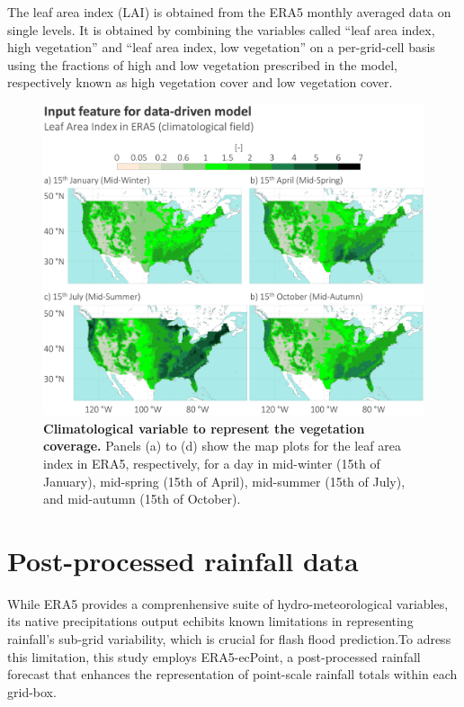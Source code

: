 The leaf area index (LAI) is obtained from the ERA5 monthly averaged data on single levels. It is obtained by combining the variables called “leaf area index, high vegetation” and “leaf area index, low vegetation” on a per-grid-cell basis using the fractions of high and low vegetation prescribed in the model, respectively known as high vegetation cover and low vegetation cover.

\begin{figure}[htbp]
\centering
\includegraphics[width=\textwidth]{lai.png}
\caption{\textbf{Climatological variable to represent the vegetation coverage.} Panels (a) to (d) show the map plots for the leaf area index in ERA5, respectively, for a day in mid-winter (15th of January), mid-spring (15th of April), mid-summer (15th of July), and mid-autumn (15th of October).}
\label{fig:lai}
\end{figure}



\section{Post-processed rainfall data}

While ERA5 provides a comprenhensive suite of hydro-meteorological variables, its native precipitations output echibits known limitations in representing rainfall's sub-grid variability, which is crucial for flash flood prediction.To adress this limitation, this study employs ERA5-ecPoint, a post-processed rainfall forecast that enhances the representation of point-scale rainfall totals within each grid-box.  

